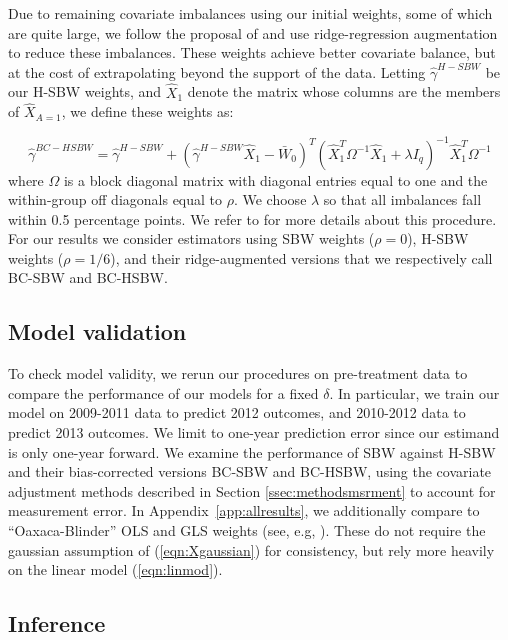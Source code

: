 \documentclass[aoas]{imsart}
\theoremstyle{plain}
\theoremstyle{remark}
\begin{document}
Due to remaining covariate imbalances using our initial weights, some of which are quite large, we follow the proposal of \cite{ben2021augmented} and use ridge-regression augmentation to reduce these imbalances. These weights achieve better covariate balance, but at the cost of extrapolating beyond the support of the data. Letting $\hat{\gamma}^{H-SBW}$ be our H-SBW weights, and $\hat{X}_1$ denote the matrix whose columns are the members of $\hat{X}_{A=1}$, we define these weights as:

\begin{equation}
\hat{\gamma}^{BC-HSBW} = \hat{\gamma}^{H-SBW} + (\hat{\gamma}^{H-SBW}\hat{X}_1 - \bar{W}_0)^T(\hat{X}_1^T\Omega^{-1}\hat{X}_1 + \lambda I_q)^{-1}\hat{X}_1^T\Omega^{-1}
\end{equation}
%
where $\Omega$ is a block diagonal matrix with diagonal entries equal to one and the within-group off diagonals equal to $\rho$. We choose $\lambda$ so that all imbalances fall within 0.5 percentage points. We refer to \cite{ben2021augmented} for more details about this procedure. For our results we consider estimators using SBW weights ($\rho = 0$), H-SBW weights ($\rho = 1/6$), and their ridge-augmented versions that we respectively call BC-SBW and BC-HSBW.

\subsection{Model validation}

To check model validity, we rerun our procedures on pre-treatment data to compare the performance of our models for a fixed $\delta$. In particular, we train our model on 2009-2011 data to predict 2012 outcomes, and 2010-2012 data to predict 2013 outcomes. We limit to one-year prediction error since our estimand is only one-year forward. We examine the performance of SBW against H-SBW and their bias-corrected versions BC-SBW and BC-HSBW, using the covariate adjustment methods described in Section \ref{ssec:methodsmsrment} to account for measurement error. In Appendix~\ref{app:allresults}, we additionally compare to ``Oaxaca-Blinder'' OLS and GLS weights (see, e.g, \cite{kline2011oaxaca}). These do not require the gaussian assumption of (\ref{eqn:Xgaussian}) for consistency, but rely more heavily on the linear model (\ref{eqn:linmod}).

\subsection{Inference}
\end{document}
